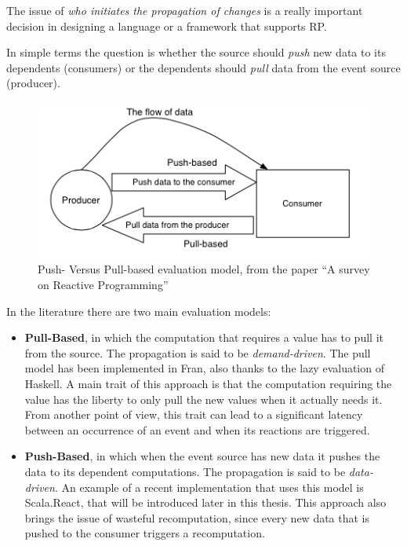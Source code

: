 The issue of \emph{who initiates the propagation of changes} is a really
important decision in designing a language or a framework that supports
RP.

In simple terms the question is whether the source should \emph{push}
new data to its dependents (consumers) or the dependents should
\emph{pull} data from the event source (producer).

\begin{figure}[htbp]
\centering
\includegraphics[scale=0.75]{imgs/eval.png}
\caption{Push- Versus Pull-based evaluation model, from the paper ``A
survey on Reactive Programming''}
\end{figure}

In the literature there are two main evaluation models:

\begin{itemize}
\itemsep1pt\parskip0pt
\item
  \textbf{Pull-Based}, in which the computation that requires a value
  has to pull it from the source. The propagation is said to be
  \emph{demand-driven}. The pull model has been implemented in Fran,
  also thanks to the lazy evaluation of Haskell. A main trait of this
  approach is that the computation requiring the value has the liberty
  to only pull the new values when it actually needs it. From another
  point of view, this trait can lead to a significant latency between an
  occurrence of an event and when its reactions are triggered.
\item
  \textbf{Push-Based}, in which when the event source has new data it
  pushes the data to its dependent computations. The propagation is said
  to be \emph{data-driven}. An example of a recent implementation that
  uses this model is Scala.React, that will be introduced later in this
  thesis. This approach also brings the issue of wasteful recomputation,
  since every new data that is pushed to the consumer triggers a
  recomputation.
\end{itemize}

